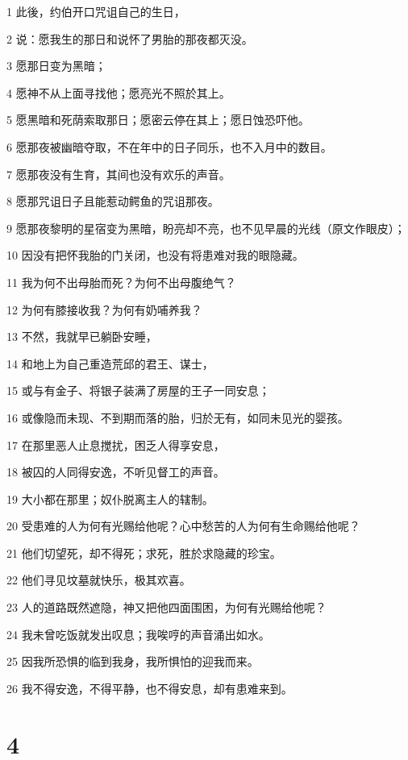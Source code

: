 \par 1 此後，约伯开口咒诅自己的生日，
\par 2 说：愿我生的那日和说怀了男胎的那夜都灭没。
\par 3 愿那日变为黑暗；
\par 4 愿神不从上面寻找他；愿亮光不照於其上。
\par 5 愿黑暗和死荫索取那日；愿密云停在其上；愿日蚀恐吓他。
\par 6 愿那夜被幽暗夺取，不在年中的日子同乐，也不入月中的数目。
\par 7 愿那夜没有生育，其间也没有欢乐的声音。
\par 8 愿那咒诅日子且能惹动鳄鱼的咒诅那夜。
\par 9 愿那夜黎明的星宿变为黑暗，盼亮却不亮，也不见早晨的光线（原文作眼皮）；
\par 10 因没有把怀我胎的门关闭，也没有将患难对我的眼隐藏。
\par 11 我为何不出母胎而死？为何不出母腹绝气？
\par 12 为何有膝接收我？为何有奶哺养我？
\par 13 不然，我就早已躺卧安睡，
\par 14 和地上为自己重造荒邱的君王、谋士，
\par 15 或与有金子、将银子装满了房屋的王子一同安息；
\par 16 或像隐而未现、不到期而落的胎，归於无有，如同未见光的婴孩。
\par 17 在那里恶人止息搅扰，困乏人得享安息，
\par 18 被囚的人同得安逸，不听见督工的声音。
\par 19 大小都在那里；奴仆脱离主人的辖制。
\par 20 受患难的人为何有光赐给他呢？心中愁苦的人为何有生命赐给他呢？
\par 21 他们切望死，却不得死；求死，胜於求隐藏的珍宝。
\par 22 他们寻见坟墓就快乐，极其欢喜。
\par 23 人的道路既然遮隐，神又把他四面围困，为何有光赐给他呢？
\par 24 我未曾吃饭就发出叹息；我唉哼的声音涌出如水。
\par 25 因我所恐惧的临到我身，我所惧怕的迎我而来。
\par 26 我不得安逸，不得平静，也不得安息，却有患难来到。

\chapter{4}

